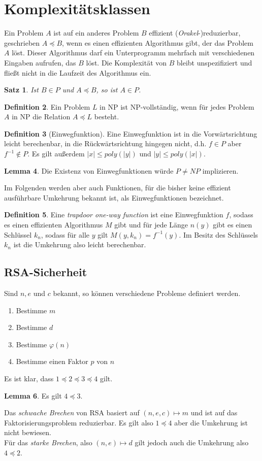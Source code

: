 \documentclass[a4paper, 12pt]{article}
\theoremstyle{plain}
\newtheorem{theorem}{Satz}[subsection] %
\theoremstyle{definition}
\newtheorem{definition}[theorem]{Definition} %
\theoremstyle{lemma}
\newtheorem{lemma}[theorem]{Lemma}
\theoremstyle{remark}
\theoremstyle{corollary}
\theoremstyle{example}
\begin{document}
\section{Komplexitätsklassen}
	Ein Problem $A$ ist auf ein anderes Problem $B$ effizient (\textit{Orakel}-)reduzierbar, geschrieben $A\preceq B$, wenn es einen effizienten Algorithmus gibt, der das Problem $A$ löst. Dieser Algorithmus darf ein Unterprogramm mehrfach mit verschiedenen Eingaben aufrufen, das $B$ löst. Die Komplexität von $B$ bleibt unspezifiziert und fließt nicht in die Laufzeit des Algorithmus ein. 
	\begin{theorem}
		Ist $B \in P$ und $A\preceq B$, so ist $A \in P$.
	\end{theorem}
	\begin{definition}
		Ein Problem $L$ in NP ist NP-vollständig, wenn für jedes Problem $A$ in NP die Relation $A\preceq L$ besteht.
	\end{definition}
	\begin{definition}[Einwegfunktion]
		Eine Einwegfunktion ist in die Vorwärtsrichtung leicht berechenbar, in die Rückwärtsrichtung hingegen nicht, d.h. $f\in P$ aber $f^{-1} \notin P$. Es gilt außerdem $\left|x\right| \leq poly(\left|y\right|)$ und $\left|y\right| \leq poly(\left|x\right|)$. 
	\end{definition}
	\begin{lemma}
		Die Existenz von Einwegfunktionen würde $P\neq NP$ implizieren.
	\end{lemma}
	Im Folgenden werden aber auch Funktionen, für die bisher keine effizient ausführbare Umkehrung bekannt ist, als Einwegfunktionen bezeichnet.
	\begin{definition}
		Eine \textit{trapdoor one-way function} ist eine Einwegfunktion $f$, sodass es einen effizienten Algorithmus $M$ gibt und für jede Länge $n(y)$ gibt es einen Schlüssel $k_n$, sodass für alle $y$ gilt $M(y,k_n) = f^{-1}(y)$. Im Besitz des Schlüssels $k_n$ ist die Umkehrung also leicht berechenbar.
	\end{definition}
	\subsection{RSA-Sicherheit}
	Sind $n,e$ und $c$ bekannt, so können verschiedene Probleme definiert werden.
	\begin{enumerate}
		\item Bestimme $m$
		\item Bestimme $d$
		\item Bestimme $\varphi(n)$
		\item Bestimme einen Faktor $p$ von $n$
	\end{enumerate}
	Es ist klar, dass $1 \preceq 2 \preceq 3 \preceq 4$ gilt.
	\begin{lemma}
		Es gilt $4 \preceq 3$.
	\end{lemma}
	Das \textit{schwache Brechen} von RSA basiert auf $(n,e,c) \mapsto m$ und ist auf das Faktorisierungsproblem reduzierbar. Es gilt also $1 \preceq 4$ aber die Umkehrung ist nicht bewiesen.\\
	Für das \textit{starke Brechen}, also $(n,e) \mapsto d$ gilt jedoch auch die Umkehrung also $4 \preceq 2$.
\end{document}
